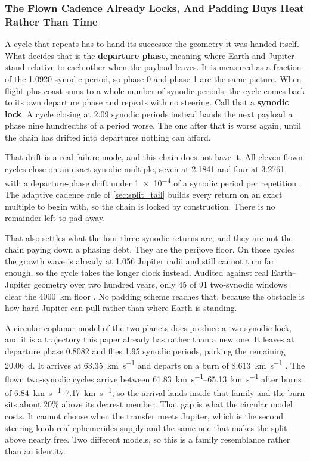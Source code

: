 \documentclass{article}
\begin{document}
\subsubsection{The Flown Cadence Already Locks, And Padding Buys Heat Rather Than Time}\label{sec:synodic_lock}
A cycle that repeats has to hand its successor the geometry it was handed itself. What decides that is the \textbf{departure phase}, meaning where Earth and Jupiter stand relative to each other when the payload leaves. It is measured as a fraction of the \SI{1.0920}{\year} synodic period, so phase 0 and phase 1 are the same picture. When flight plus coast sums to a whole number of synodic periods, the cycle comes back to its own departure phase and repeats with no steering. Call that a \textbf{synodic lock}. A cycle closing at \num{2.09} synodic periods instead hands the next payload a phase nine hundredths of a period worse. The one after that is worse again, until the chain has drifted into departures nothing can afford.

That drift is a real failure mode, and this chain does not have it. All eleven flown cycles close on an exact synodic multiple, seven at \SI{2.1841}{\year} and four at \SI{3.2761}{\year}, with a departure-phase drift under \num{1e-4} of a synodic period per repetition \cite{Katz_aim_is_all_you_need_2025}. The adaptive cadence rule of \autoref{sec:split_tail} builds every return on an exact multiple to begin with, so the chain is locked by construction. There is no remainder left to pad away.

That also settles what the four three-synodic returns are, and they are not the chain paying down a phasing debt. They are the perijove floor. On those cycles the growth wave is already at \num{1.056} Jupiter radii and still cannot turn far enough, so the cycle takes the longer clock instead. Audited against real Earth--Jupiter geometry over two hundred years, only 45 of 91 two-synodic windows clear the \SI{4000}{\kilo\meter} floor \cite{Katz_aim_is_all_you_need_2025}. No padding scheme reaches that, because the obstacle is how hard Jupiter can pull rather than where Earth is standing.

A circular coplanar model of the two planets does produce a two-synodic lock, and it is a trajectory this paper already has rather than a new one. It leaves at departure phase \num{0.8082} and flies \num{1.95} synodic periods, parking the remaining \SI{20.06}{\day}. It arrives at \SI{63.35}{\kilo\meter\per\second} and departs on a burn of \SI{8.613}{\kilo\meter\per\second} \cite{Katz_aim_is_all_you_need_2025}. The flown two-synodic cycles arrive between \SIrange[range-phrase={ and }]{61.83}{65.13}{\kilo\meter\per\second} after burns of \SIrange{6.84}{7.17}{\kilo\meter\per\second}, so the arrival lands inside that family and the burn sits about 20\% above its dearest member. That gap is what the circular model costs. It cannot choose when the transfer meets Jupiter, which is the second steering knob real ephemerides supply and the same one that makes the split above nearly free. Two different models, so this is a family resemblance rather than an identity.
\end{document}
